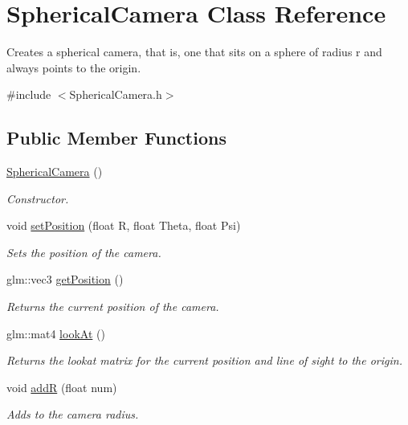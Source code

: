 \hypertarget{class_spherical_camera}{}\section{Spherical\+Camera Class Reference}
\label{class_spherical_camera}


Creates a spherical camera, that is, one that sits on a sphere of radius r and always points to the origin.  




{\ttfamily \#include $<$Spherical\+Camera.\+h$>$}

\subsection*{Public Member Functions}
\begin{DoxyCompactItemize}
\item 
\hyperlink{class_spherical_camera_a65579bdc58bd5af9828d2174ac502f3f}{Spherical\+Camera} ()
\begin{DoxyCompactList}\small\item\em Constructor. \end{DoxyCompactList}\item 
void \hyperlink{class_spherical_camera_ab9a3159731b05c8c4c4df0cef7cfee1a}{set\+Position} (float R, float Theta, float Psi)
\begin{DoxyCompactList}\small\item\em Sets the position of the camera. \end{DoxyCompactList}\item 
glm\+::vec3 \hyperlink{class_spherical_camera_a1f827fbe32547f24341976e7b0449b30}{get\+Position} ()
\begin{DoxyCompactList}\small\item\em Returns the current position of the camera. \end{DoxyCompactList}\item 
glm\+::mat4 \hyperlink{class_spherical_camera_a85c47420e596eb9675496f921f271c41}{look\+At} ()
\begin{DoxyCompactList}\small\item\em Returns the lookat matrix for the current position and line of sight to the origin. \end{DoxyCompactList}\item 
void \hyperlink{class_spherical_camera_a7153206babba00890a7706ed21987463}{addR} (float num)
\begin{DoxyCompactList}\small\item\em Adds to the camera radius. \end{DoxyCompactList}\item 

\end{DoxyCompactItemize}
